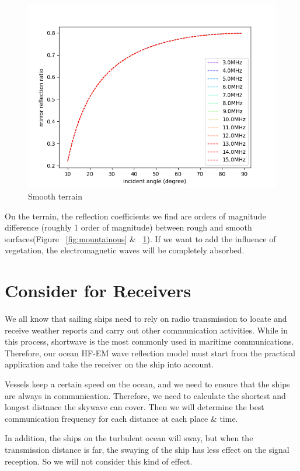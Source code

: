 \documentclass{mcmthesis}
\begin{document}
      \begin{figure}[h]
      \centering
      \includegraphics[scale=0.6]{Mon1}
      \caption{Smooth terrain}
      \label{fig:S_T}
      \end{figure}

      On the terrain, the reflection coefficients we find are orders of magnitude difference (roughly 1 order of magnitude) between rough and smooth surfaces(Figure ~\ref{fig:mountainous} \& ~\ref{fig:S_T}). If we want to add the influence of vegetation, the electromagnetic waves will be completely absorbed.

\section{Consider for Receivers}

      We all know that sailing ships need to rely on radio transmission to locate and receive weather reports and carry out other communication activities. While in this process, shortwave is the most commonly used in maritime communications. Therefore, our ocean HF-EM wave reflection model must start from the practical application and take the receiver on the ship into account.

      Vessels keep a certain speed on the ocean, and we need to ensure that the ships are always in communication. Therefore, we need to calculate the shortest and longest distance the skywave can cover. Then we will determine the best communication frequency for each distance at each place \& time.

      In addition, the ships on the turbulent ocean will sway, but when the transmission distance is far, the swaying of the ship has less effect on the signal reception. So we will not consider this kind of effect.
\end{document}
